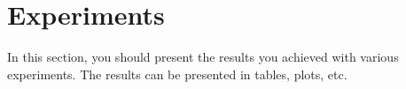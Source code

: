 
\section{Experiments} In this section, you should
present the results you achieved with various experiments. The results
can be presented in tables, plots, etc. 
